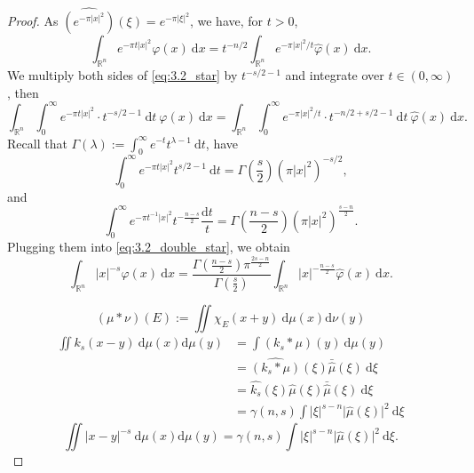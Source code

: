 \begin{proof}
As $\widehat{(e^{-\pi \lvert x \rvert^{2}})}(\xi)=e^{-\pi \lvert \xi \rvert^{2}}$, we have, for $t>0$, 
\begin{equation}\label{eq:3.2_star}
\int _{\mathbb{R}^{n}}e^{-\pi t\lvert x \rvert ^{2}}\varphi(x)\ \mathrm{d}x=t^{-n/2}\int _{\mathbb{R}^{n}}e^{-\pi \lvert x \rvert ^{2}/t}\hat{\varphi}(x)\ \mathrm{d}x.
\end{equation}
We multiply both sides of \eqref{eq:3.2_star} by $t^{-s/2-1}$ and integrate over $t\in(0,\infty)$, then
\begin{equation}\label{eq:3.2_double_star}
\int _{\mathbb{R}^{n}}\int _{0}^{\infty}e^{-\pi t\lvert x \rvert ^{2}}\cdot t^{-s/2-1}\ \mathrm{d}t\ \varphi(x)\ \mathrm{d}x=\int _{\mathbb{R}^{n}}\int _{0}^{\infty}e^{-\pi \lvert x \rvert ^{2}/t}\cdot t^{-n/2+s/2-1}\ \mathrm{d}t\ \hat{\varphi}(x)\ \mathrm{d}x.
\end{equation}
Recall that $\Gamma(\lambda):=\displaystyle \int _{0}^{\infty}e^{-t}t^{\lambda-1}\ \mathrm{d}t$, have
$$
\int _{0}^{\infty}e^{-\pi t\lvert x \rvert ^{2}}t^{s/2-1}\ \mathrm{d}t=\Gamma\left( \frac{s}{2} \right)(\pi \lvert x \rvert ^{2})^{-s/2},
$$
and
$$
\int _{0}^{\infty}e^{-\pi t^{-1}\lvert x \rvert ^{2}}t^{-\frac{n-s}{2}} \frac{\mathrm{d}t}{t}=\Gamma\left( \frac{n-s}{2} \right)(\pi \lvert x \rvert ^{2})^{\frac{s-n}{2}}.
$$
Plugging them into \eqref{eq:3.2_double_star}, we obtain
$$
\int _{\mathbb{R}^{n}}\lvert x \rvert ^{-s}\varphi(x)\ \mathrm{d}x=\frac{\Gamma\left( \frac{n-s}{2} \right)\pi ^{\frac{2s-n}{2}}}{\Gamma\left( \frac{s}{2} \right)}\int _{\mathbb{R}^{n}}\lvert x \rvert ^{-\frac{n-s}{2}}\hat{\varphi}(x)\ \mathrm{d}x.
$$

$$
(\mu*\nu)(E):= \iint \chi _{E}(x+y)\ \mathrm{d}\mu(x)\mathrm{d}\nu(y)
$$
$$
\begin{aligned}
\iint k_{s}(x-y)\ \mathrm{d}\mu(x)\mathrm{d}\mu(y) & = \int(k_{s}*\mu)(y)\ \mathrm{d}\mu(y) \\
 & =\widehat{(k_{s}*\mu)}(\xi)\bar{\hat{\mu}}(\xi)\ \mathrm{d}\xi \\
 & = \hat{k_{s}}(\xi)\hat{\mu}(\xi)\bar{\hat{\mu}}(\xi)\ \mathrm{d}\xi \\
 & = \gamma(n,s)\int \lvert \xi \rvert ^{s-n}\lvert \hat{\mu}(\xi) \rvert ^{2}\ \mathrm{d}\xi
\end{aligned}
$$
\begin{equation}\label{eq:3.2_1}
\iint \lvert x-y \rvert ^{-s}\ \mathrm{d}\mu(x)\mathrm{d}\mu(y)=\gamma(n,s)\int \lvert \xi \rvert ^{s-n}\lvert \hat{\mu}(\xi) \rvert ^{2}\ \mathrm{d}\xi.
\end{equation}
\end{proof}

